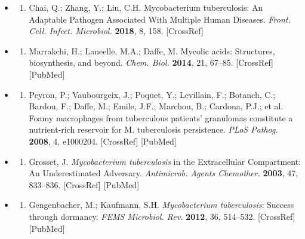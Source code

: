 \documentclass{article}
\begin{document}
\begin{itemize}
\begin{enumerate}
\end{enumerate}

\item \begin{enumerate}
\item 
Chai, Q.; Zhang, Y.; Liu, C.H. Mycobacterium tuberculosis: An Adaptable Pathogen Associated With Multiple Human Diseases. \textit{Front. Cell. Infect. Microbiol.} \textbf{2018}, 8, 158. [CrossRef]

\end{enumerate}

\item \begin{enumerate}
\item 
Marrakchi, H.; Laneelle, M.A.; Daffe, M. Mycolic acids: Structures, biosynthesis, and beyond. \textit{Chem. Biol.} \textbf{2014}, 21, 67–85. [CrossRef] [PubMed]

\end{enumerate}

\item \begin{enumerate}
\item 
Peyron, P.; Vaubourgeix, J.; Poquet, Y.; Levillain, F.; Botanch, C.; Bardou, F.; Daffe, M.; Emile, J.F.; Marchou, B.; Cardona, P.J.; et al. Foamy macrophages from tuberculous patients' granulomas constitute a nutrient-rich reservoir for M. tuberculosis persistence. \textit{PLoS Pathog.} \textbf{2008}, 4, e1000204. [CrossRef] [PubMed]

\end{enumerate}

\item \begin{enumerate}
\item 
Grosset, J. \textit{Mycobacterium tuberculosis} in the Extracellular Compartment: An Underestimated Adversary. \textit{Antimicrob. Agents Chemother.} \textbf{2003}, 47, 833–836. [CrossRef] [PubMed]

\end{enumerate}

\item \begin{enumerate}
\item 
Gengenbacher, M.; Kaufmann, S.H. \textit{Mycobacterium tuberculosis}: Success through dormancy. \textit{FEMS Microbiol. Rev.} \textbf{2012}, 36, 514–532. [CrossRef] [PubMed]

\end{enumerate}


\end{itemize}
\end{document}
